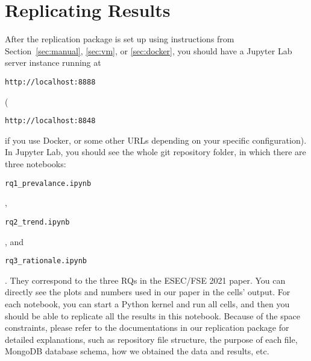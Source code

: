 \documentclass[sigconf]{acmart}
\newcommand{\Code}[1]{\begin{small}\texttt{#1}\end{small}}
\begin{document}
\section{Replicating Results}

After the replication package is set up using instructions from Section~\ref{sec:manual}, \ref{sec:vm}, or \ref{sec:docker}, you should have a Jupyter Lab server instance running at \Code{http://localhost:8888} (\Code{http://localhost:8848} if you use Docker, or some other URLs depending on your specific configuration).
In Jupyter Lab, you should see the whole git repository folder, in which there are three notebooks: \Code{rq1\_prevalance.ipynb}, \Code{rq2\_trend.ipynb}, and \Code{rq3\_rationale.ipynb}.
They correspond to the three RQs in the ESEC/FSE 2021 paper.
You can directly see the plots and numbers used in our paper in the cells' output.
For each notebook, you can start a Python kernel and run all cells, and then you should be able to replicate all the results in this notebook.
Because of the space constraints, please refer to the documentations in our replication package for detailed explanations, such as repository file structure, the purpose of each file, MongoDB database schema, how we obtained the data and results, etc.



\end{document}
